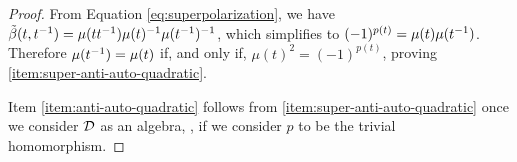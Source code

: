 \begin{proof}
	From Equation \eqref{eq:superpolarization}, we have $\tilde\beta (t, t^{-1}) = \mu (tt^{-1}) \mu(t)^{-1} \mu(t^{-1})^{-1}$, which simplifies to $(-1)^{p(t)} = \mu(t)\mu(t^{-1})$.
	Therefore $\mu(t^{-1}) = \mu(t)$ if, and only if, $\mu(t)^2 = (-1)^{p(t)}$, proving \eqref{item:super-anti-auto-quadratic}.

	Item \eqref{item:anti-auto-quadratic} follows from \eqref{item:super-anti-auto-quadratic} once we consider $\mathcal{D}$ as an algebra, \ie, if we consider $p$ to be the trivial homomorphism.
\end{proof}



